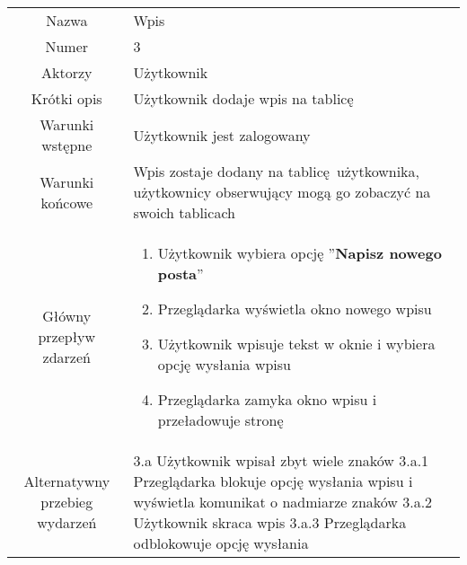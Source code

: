 \documentclass[a4paper]{article}
\begin{document}
\begin{tabular}{c p{10cm}}
Nazwa&	Wpis\\
Numer	& 3\\
Aktorzy &	Użytkownik\\
Krótki opis &  Użytkownik dodaje wpis na tablicę\\
Warunki wstępne& Użytkownik jest zalogowany\\
Warunki końcowe& Wpis zostaje dodany na tablicę użytkownika, użytkownicy obserwujący mogą go zobaczyć na swoich tablicach\\
Główny przepływ zdarzeń&
\begin{enumerate}
\item Użytkownik wybiera opcję ''\textbf{Napisz nowego posta}'' 
\item Przeglądarka wyświetla okno nowego wpisu 
\item Użytkownik wpisuje tekst w oknie i wybiera opcję wysłania wpisu
\item Przeglądarka zamyka okno wpisu i przeładowuje stronę
\end{enumerate} \\

Alternatywny przebieg wydarzeń &
3.a Użytkownik wpisał zbyt wiele znaków \newline
3.a.1 Przeglądarka blokuje opcję wysłania wpisu i wyświetla komunikat o nadmiarze znaków \newline
3.a.2 Użytkownik skraca wpis \newline
3.a.3 Przeglądarka odblokowuje opcję wysłania \newline \\
\hline
\end{tabular}
\newline
\newline
\end{document}
